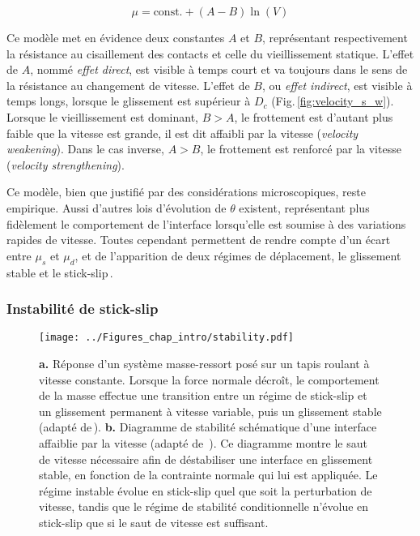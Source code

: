\begin{equation}
\mu = \text{const.}+(A-B)\ln(V)
\end{equation}


Ce modèle met en évidence deux constantes $A$ et $B$, représentant respectivement la résistance au cisaillement des contacts et celle du vieillissement statique. L'effet de $A$, nommé \textit{effet direct}, est visible à temps court et va toujours dans le sens de la résistance au changement de vitesse. L'effet de $B$, ou \textit{effet indirect}, est visible à temps longs, lorsque le glissement est supérieur à $D_c$ (Fig.\,\ref{fig:velocity_s_w}). Lorsque le vieillissement est dominant, $B>A$, le frottement est d'autant plus faible que la vitesse est grande, il est dit affaibli par la vitesse (\textit{velocity weakening}). Dans le cas inverse, $A>B$, le frottement est renforcé par la vitesse (\textit{velocity strengthening}).

Ce modèle, bien que justifié par des considérations microscopiques, reste empirique. Aussi d'autres lois d'évolution de $\theta$ existent, représentant plus fidèlement le comportement de l'interface lorsqu'elle est soumise à des variations rapides de vitesse. Toutes cependant permettent de rendre compte d'un écart entre $\mu_s$ et $\mu_d$, et de l'apparition de deux régimes de déplacement, le glissement stable et le stick-slip\,\cite{ruina_slip_1983,nagata_revised_2012,aharonov_physicsbased_2018}.


\subsubsection{Instabilité de stick-slip}


\begin{figure}[htb]
\centering
\texttt{[image: ../Figures\_chap\_intro/stability.pdf]}
\caption[Diagramme de stabilité d'un mouvement de stick-slip]{\textbf{a.} Réponse d'un système masse-ressort posé sur un tapis roulant à vitesse constante. Lorsque la force normale décroît, le comportement de la masse effectue une transition entre un régime de stick-slip et un glissement permanent à vitesse variable, puis un glissement stable (adapté de\,\cite{baumberger_physical_1999}). \textbf{b.} Diagramme de stabilité schématique d'une interface affaiblie par la vitesse (adapté de \,\cite{scholz_earthquakes_1998}). Ce diagramme montre le saut de vitesse nécessaire afin de déstabiliser une interface en glissement stable, en fonction de la contrainte normale qui lui est appliquée. Le régime instable évolue en stick-slip quel que soit la perturbation de vitesse, tandis que le régime de stabilité conditionnelle n'évolue en stick-slip que si le saut de vitesse est suffisant.}
\label{fig:ss2}
\end{figure}


